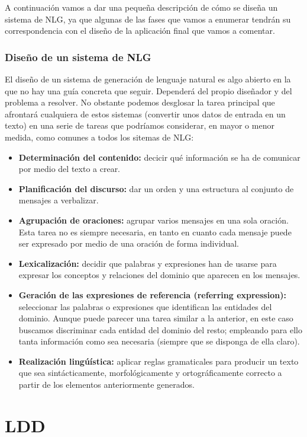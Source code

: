\documentclass[10pt,a4paper]{article}
\begin{document}
A continuación vamos a dar una pequeña descripción de cómo se diseña un sistema de NLG, ya que algunas de las fases que vamos a enumerar tendrán su correspondencia con el diseño de la aplicación final que vamos a comentar.

\subsubsection{Diseño de un sistema de NLG}

El diseño de un sistema de generación de lenguaje natural es algo abierto en la que no hay una guía concreta que seguir. Dependerá del propio diseñador y del problema a resolver. No obstante podemos desglosar la tarea principal que afrontará cualquiera de estos sistemas (convertir unos datos de entrada en un texto) en una serie de tareas que podríamos considerar, en mayor o menor medida, como comunes a todos los sitemas de NLG:

\begin{itemize}
\item \textbf{Determinación del contenido:} decicir qué información se ha de comunicar por medio del texto a crear.
\item \textbf{Planificación del discurso:} dar un orden y una estructura al conjunto de mensajes a verbalizar.
\item \textbf{Agrupación de oraciones:} agrupar varios mensajes en una sola oración. Esta tarea no es siempre necesaria, en tanto en cuanto cada mensaje puede ser expresado por medio de una oración de forma individual.
\item \textbf{Lexicalización:} decidir que palabras y expresiones han de usarse para expresar los conceptos y relaciones del dominio que aparecen en los mensajes.
\item \textbf{Geración de las expresiones de referencia (referring expression):} seleccionar las palabras o expresiones que identifican las entidades del dominio. Aunque puede parecer una tarea similar a la anterior, en este caso buscamos discriminar cada entidad del dominio del resto; empleando para ello tanta información como sea necesaria (siempre que se disponga de ella claro).
\item \textbf{Realización lingúística:} aplicar reglas gramaticales para producir un texto que sea sintácticamente, morfológicamente y ortográficamente correcto a partir de los elementos anteriormente generados.
\end{itemize}

\section{LDD}
\end{document}
